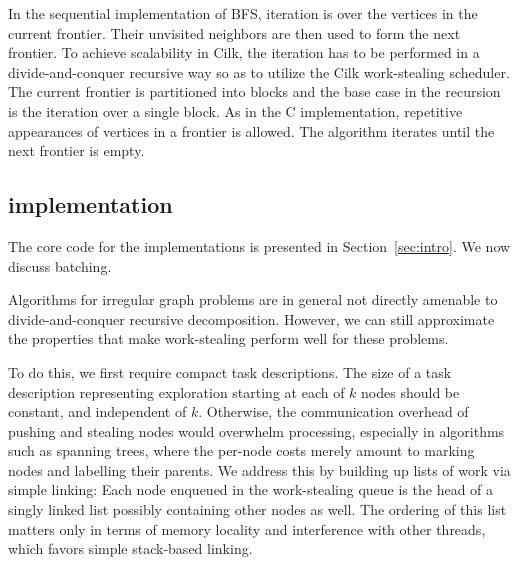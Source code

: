 In the sequential implementation of BFS, iteration is over the vertices in the current frontier. Their unvisited neighbors are then used to form the next frontier. To achieve scalability in Cilk, the iteration has to be performed in a divide-and-conquer recursive way so as to utilize the Cilk work-stealing scheduler. The current frontier is partitioned into blocks and the base case in the recursion is the iteration over a single block. As in
the C implementation, repetitive appearances of vertices in a frontier is
allowed. The algorithm iterates until the next frontier is empty.


\subsection{\XWS{} implementation}\label{sec:Performance}

The core code for the \XWS{} implementations is presented in 
Section~\ref{sec:intro}.  We now discuss batching.


Algorithms for irregular graph problems are in general not directly
amenable to divide-and-conquer recursive decomposition. However, we
can still approximate the properties that make work-stealing perform
well for these problems.

To do this, we first require compact task descriptions.  The size of a
task description representing exploration starting at each of $k$ nodes
should be constant, and independent of $k$. Otherwise, the communication
overhead of pushing and stealing nodes would overwhelm processing,
especially in algorithms such as spanning trees, where the per-node
costs merely amount to marking nodes and labelling their parents.  We
address this by building up lists of work via simple linking: Each
node enqueued in the work-stealing queue is the head of a singly
linked list possibly containing other nodes as well. The ordering of
this list matters only in terms of memory locality and interference
with other threads, which favors simple stack-based linking.

